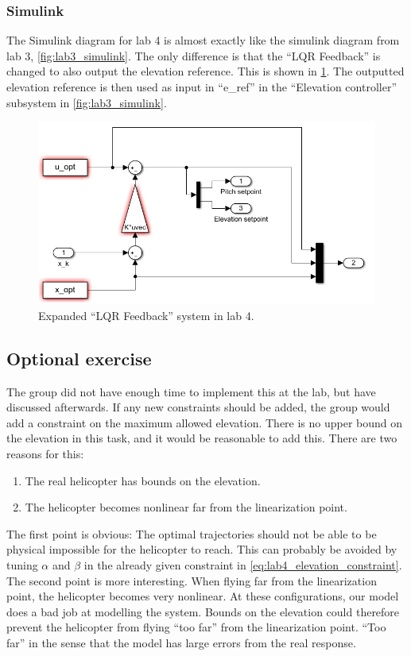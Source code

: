\documentclass[../main.tex]{subfiles}
\begin{document}
\subsubsection{Simulink}
The Simulink diagram for lab 4 is almost exactly like the simulink diagram from lab 3, \cref{fig:lab3_simulink}. The only difference is that the ``LQR Feedback'' is changed to also output the elevation reference. This is shown in \cref{fig:lab4_simulink_lqr}. The outputted elevation reference is then used as input in ``e\_ref'' in the ``Elevation controller'' subsystem in \cref{fig:lab3_simulink}. 
\begin{figure}[h]
	\centering
	\includegraphics[width=1\linewidth, keepaspectratio]{code/lab4_simulink_2}
	\caption{Expanded ``LQR Feedback'' system in lab 4.}
	\label{fig:lab4_simulink_lqr}
\end{figure}
\subsection{Optional exercise}
The group did not have enough time to implement this at the lab, but have discussed afterwards. If any new constraints should be added, the group would add a constraint on the maximum allowed elevation. There is no upper bound on the elevation in this task, and it would be reasonable to add this. There are two reasons for this: 
\begin{enumerate}
	\item The real helicopter has bounds on the elevation.
	\item The helicopter becomes nonlinear far from the linearization point.
\end{enumerate}
The first point is obvious: The optimal trajectories should not be able to be physical impossible for the helicopter to reach. This can probably be avoided by tuning $ \alpha  $ and $ \beta $ in the already given constraint in \cref{eq:lab4_elevation_constraint}. The second point is more interesting. When flying far from the linearization point, the helicopter becomes very nonlinear. At these configurations, our model does a bad job at modelling the system. Bounds on the elevation could therefore prevent the helicopter from flying ``too far'' from the linearization point. ``Too far'' in the sense that the model has large errors from the real response.
\end{document}
